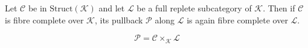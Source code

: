 Let $\mathcal{C}$ be in $\text{Struct}(\mathcal{K})$ and let $\mathcal{L}$ be a full replete subcategory of $\mathcal{K}$. Then if $\mathcal{C}$ is fibre complete over $\mathcal{K}$, its pullback $\mathcal{P}$ along $\mathcal{L}$ is again fibre complete over $\mathcal{L}$.

$$\mathcal{P} = \mathcal{C} \times_{\mathcal{K}} \mathcal{L}$$
